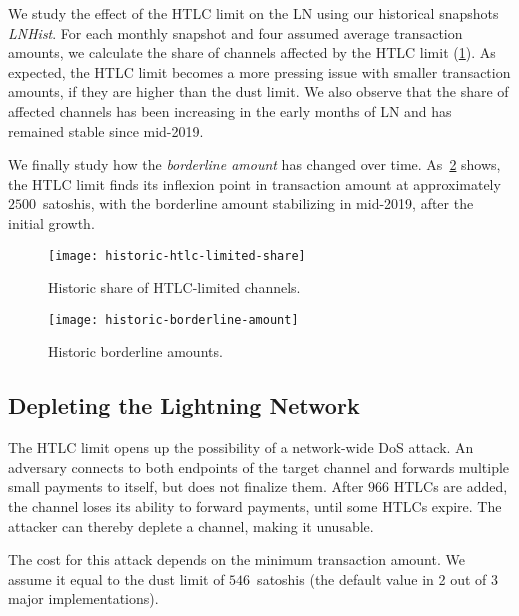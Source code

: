 We study the effect of the HTLC limit on the LN using our historical snapshots \emph{LNHist}.
For each monthly snapshot and four assumed average transaction amounts, we calculate the share of channels affected by the HTLC limit (\cref{fig:historic-htlc-limited-share}).
As expected, the HTLC limit becomes a more pressing issue 
with smaller transaction amounts, if they are higher than the dust limit.
We also observe that the share of affected channels has been increasing in the early months of LN and has remained stable since mid-2019.

We finally study how the \textit{borderline amount} has changed over time. 
As~\cref{fig:historic-borderline-amount} shows, the HTLC limit finds 
its inflexion point in transaction amount at approximately $2500$~satoshis, with the borderline amount stabilizing in mid-2019, after the initial growth.

\begin{figure}[tb]
	\centering
	\texttt{[image: historic-htlc-limited-share]}
	\caption{Historic share of HTLC-limited channels.\label{fig:historic-htlc-limited-share}}
\end{figure}

\begin{figure}[tb]
	\centering
	\texttt{[image: historic-borderline-amount]}
	\caption{Historic borderline amounts.\label{fig:historic-borderline-amount}}
\end{figure}



\subsection{Depleting the Lightning Network}

The HTLC limit opens up the possibility of a network-wide DoS attack.
An adversary connects to both endpoints of the target channel and forwards multiple small payments to itself, 
but does not finalize them.
After $966$ HTLCs are added, the channel loses its ability to forward payments, until some HTLCs expire. 
The attacker can thereby deplete a channel, making it unusable.

The cost for this attack depends on the minimum transaction amount.
We assume it equal to the dust limit of $546$~satoshis (the default value in 2 out of 3 major implementations).

